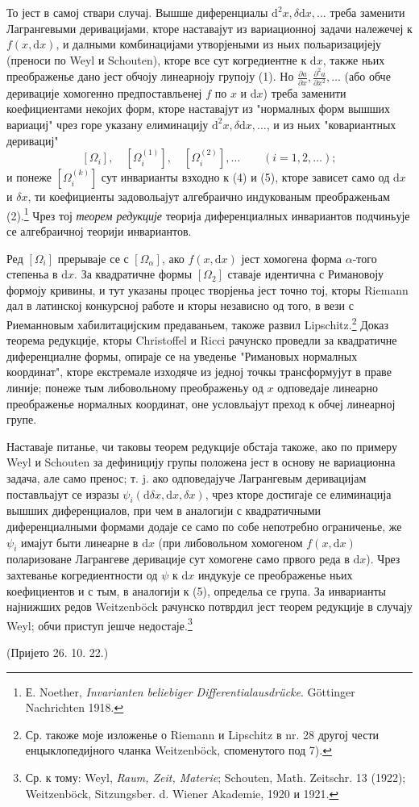 ﻿\documentclass[11pt]{article}
\providecommand{\dd}{\mathrm d}
\begin{document}
То јест в самој ствари случај. Вышше диференциалы $\dd^2x,\delta\dd x,\ldots$ треба заменити Лагрангевыми деривацијами, кторе наставајут из вариационној задачи належечеј к $f(x,\dd x)$, и далными комбинацијами утворјеными из ньих польаризацијеју (преноси по Weyl и Schouten), кторе все сут когредиентне к $\dd x$, также ньих преображенье дано јест обчоју линеарноју групоју (1). Но $\frac{\partial a}{\partial x},\frac{\partial^2a}{\partial x^2},\ldots$ (або обче деривације хомогенно предпоставльенеј $f$ по $x$ и $\dd x$) треба заменити коефициентами некојих форм, кторе наставајут из "нормалных форм вышших вариациј" чрез горе указану елиминацију $\dd^2x,\delta\dd x,\ldots$, и из ньих "ковариантных деривациј"
\[
 [\Omega_i],\quad [\Omega_i^{(1)}],\quad [\Omega_i^{(2)}],\ldots\qquad (i=1,2,\ldots);
\]
и понеже $[\Omega_i^{(k)}]$ сут инварианты взходно к (4) и (5), кторе зависет само од $\dd x$ и $\delta x$, ти коефициенты задовольајут алгебраично индукованым преображеньам (2).\footnote{Е. Noether, \emph{Invarianten beliebiger Differentialausdrücke}. Göttinger Nachrichten 1918.} Чрез тој \emph{теорем редукције} теорија диференциалных инвариантов подчиньује се алгебраичној теорији инвариантов.

Ред $[\Omega_i]$ прерываје се с $[\Omega_\alpha]$, ако $f(x,\dd x)$ јест хомогена форма $\alpha$-того степеньа в $\dd x$. За квадратичне формы $[\Omega_2]$ ставаје идентична с Римановоју формоју кривины, и тут указаны процес творјеньа јест точно тој, кторы Riemann дал в латинској конкурсној работе и кторы независно од того, в вези с Риеманновым хабилитацијским предаваньем, такоже развил Lipschitz.\footnote{Ср. такоже моје изложенье о Riemann и Lipschitz в nr. 28 другој чести енцыклопедијного чланка Weitzenböck, споменутого под 7).} Доказ теорема редукције, кторы Christoffel и Ricci рачунско проведли за квадратичне диференциалне формы, опираје се на уведенье "Римановых нормалных координат", кторе екстремале изходяче из једној точкы трансформујут в праве линије; понеже тым либовольному преображеньу од $x$ одповедаје линеарно преображенье нормалных координат, оне условльајут преход к обчеј линеарној групе.

Наставаје питанье, чи таковы теорем редукције обстаја такоже, ако по примеру Weyl и Schouten за дефиницију групы положена јест в основу не вариационна задача, але само пренос; т. j. ако одповедајуче Лагрангевым деривацијам поставльајут се изразы $\psi_i(\dd\delta x,\dd x,\delta x)$, чрез кторе достигаје се елиминација вышших диференциалов, при чем в аналогији с квадратичными диференциалными формами додаје се само по собе непотребно ограниченье, же $\psi_i$ имајут быти линеарне в $\dd x$ (при либовольном хомогеном $f(x,\dd x)$ поларизоване Лагрангеве деривације сут хомогене само првого реда в $\dd x$). Чрез захтеванье когредиентности од $\psi$ к $\dd x$ индукује се преображенье ньих коефициентов и с тым, в аналогији к (5), определьа се група. За инварианты најнижших редов Weitzenböck рачунско потврдил јест теорем редукције в случају Weyl; обчи приступ јешче недостаје.\footnote{Ср. к тому: Weyl, \emph{Raum, Zeit, Materie}; Schouten, Math. Zeitschr. 13 (1922); Weitzenböck, Sitzungsber. d. Wiener Akademie, 1920 и 1921.}

\begin{center}
(Пријето 26. 10. 22.)
\end{center}
\end{document}

